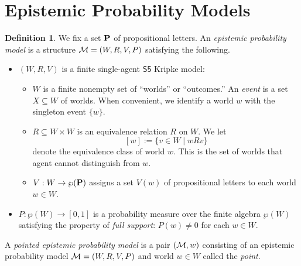 \documentclass[12pt]{article}
\theoremstyle{definition}
\newtheorem{definition}[theorem]{Definition}
\newcommand{\M}{{\cal M}}      %
\newcommand{\Prop}{{\bf P}}    %
\newcommand{\KBeq}{{\mathsf{KB.5}}}             %
\begin{document}

\section{Epistemic Probability Models}
\label{Section:EPL} 

\begin{definition}
  \label{definition:epistemic-probability-model}
  We fix a set $\Prop$ of propositional letters.  An \emph{epistemic
    probability model} is a structure $\M=(W,R,V,P)$ satisfying the
  following.
  \begin{itemize} 
  \item $(W,R,V)$ is a finite single-agent $\mathsf{S5}$ Kripke model:
    \begin{itemize}
    \item $W$ is a finite nonempty set of ``worlds'' or ``outcomes.''
      An \emph{event} is a set $X\subseteq W$ of worlds.  When
      convenient, we identify a world $w$ with the singleton event
      $\{w\}$.
      
    \item $R\subseteq W\times W$ is an equivalence relation $R$ on
      $W$.  We let
      \[
      [w]:=\{v\in W\mid wRv\}
      \]
      denote the equivalence class of world $w$.  This is the set of
      worlds that agent cannot distinguish from $w$.

    \item $V:W\to\wp(\Prop)$ assigns a set $V(w)$ of propositional
      letters to each world $w\in W$.
    \end{itemize}

  \item $P:\wp(W)\to[0,1]$ is a probability measure over the finite
    algebra $\wp(W)$ satisfying the property of \emph{full support\/}:
    $P(w)\neq0$ for each $w\in W$.
  \end{itemize}
  A \emph{pointed epistemic probability model} is a pair $(\M,w)$
  consisting of an epistemic probability model $\M=(W,R,V,P)$ and
  world $w\in W$ called the \emph{point}.
\end{definition}
\end{document}
